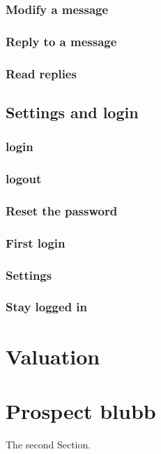 \documentclass[12pt,a4paper,oneside]{report}
\begin{document}
\subsection{Modify a message}

\subsection{Reply to a message}

\subsection{Read replies}

\section{Settings and login}

\subsection{login}

\subsection{logout}

\subsection{Reset the password}

\subsection{First login}

\subsection{Settings}

\subsection{Stay logged in}

\chapter{Valuation}

\chapter{Prospect blubb}


The second Section.\\
\end{document}
